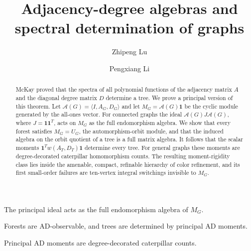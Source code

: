 \documentclass[a4paper,fleqn]{cas-sc}
\theoremstyle{definition}
\theoremstyle{remark}
\begin{document}
\let\WriteBookmarks\relax
\def\floatpagepagefraction{1}
\def\textpagefraction{.001}


\title [mode = title]{Adjacency-degree algebras and spectral determination of graphs}

\author[1]{Zhipeng Lu}
\cormark[1]



\author[2]{Pengxiang Li}



\begin{abstract}
McKay proved that the spectra of all polynomial functions of the adjacency
matrix $A$ and the diagonal degree matrix $D$ determine a tree.  We prove a
principal version of this theorem.  Let $\mathcal A(G)=\langle I,A_G,D_G\rangle$
and let $M_G=\mathcal A(G)\mathbf1$ be the cyclic module generated by the
all-ones vector.  For connected graphs the ideal $\mathcal A(G)J\mathcal A(G)$,
where $J=\mathbf1\mathbf1^T$, acts on $M_G$ as the full endomorphism algebra.  We
show that every forest satisfies $M_G=U_G$, the automorphism-orbit module, and
that the induced algebra on the orbit quotient of a tree is a full matrix algebra.
It follows that the scalar moments $\mathbf1^Tw(A_T,D_T)\mathbf1$ determine every
tree.  For general graphs these moments are degree-decorated caterpillar
homomorphism counts.  The resulting moment-rigidity class lies inside the
amenable, compact, refinable hierarchy of color refinement, and its first
small-order failures are ten-vertex integral switchings invisible to $M_G$.
\end{abstract}

\begin{highlights}
\item The principal ideal acts as the full endomorphism algebra of $M_G$.
\item Forests are AD-observable, and trees are determined by principal AD moments.
\item Principal AD moments are degree-decorated caterpillar counts.
\end{highlights}
\end{document}
